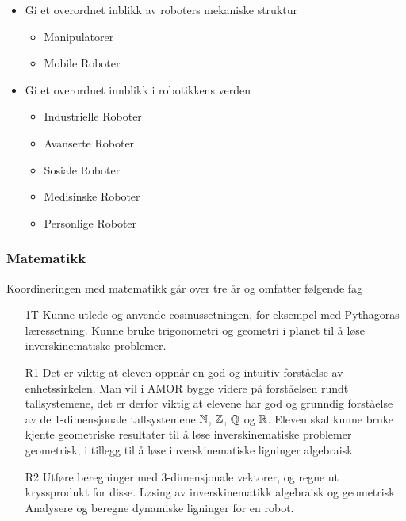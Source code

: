\begin{itemize}
\begin{itemize}
							\item Gi et overordnet inblikk av roboters mekaniske struktur

							\begin{itemize}
								\item Manipulatorer
								\item Mobile Roboter
							\end{itemize}

							\item Gi et overordnet innblikk i robotikkens verden

							\begin{itemize}
								\item Industrielle Roboter
								\item Avanserte Roboter
								\item Sosiale Roboter
								\item Medisinske Roboter
								\item Personlige Roboter
							\end{itemize}

						\end{itemize}

		\end{itemize}


	\subsubsection*{Matematikk}

	Koordineringen med matematikk går over tre år og omfatter følgende fag

		\begin{itemize}

			\item[1T] Kunne utlede og anvende cosinussetningen, for eksempel med Pythagoras læressetning. Kunne bruke trigonometri og geometri i planet til å løse inverskinematiske problemer.
			\item[R1] Det er viktig at eleven oppnår en god og intuitiv forståelse av enhetssirkelen. Man vil i AMOR bygge videre på forståelsen rundt tallsystemene, det er derfor viktig at elevene har god og grunndig forståelse av de 1-dimensjonale tallsystemene $\mathbb{N}$, $\mathbb{Z}$, $\mathbb{Q}$ og $\mathbb{R}$. Eleven skal kunne bruke kjente geometriske resultater til å løse inverskinematiske problemer geometrisk, i tillegg til å løse inverskinematiske ligninger algebraisk.
			\item[R2] Utføre beregninger med 3-dimensjonale vektorer, og regne ut kryssprodukt for disse. Løsing av inverskinematikk algebraisk og geometrisk. Analysere og beregne dynamiske ligninger for en robot.

		\end{itemize}


